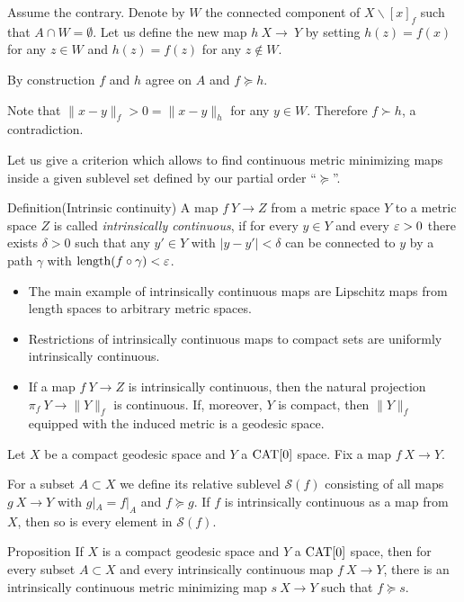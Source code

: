 \documentclass{article}
\begin{document}
Assume the contrary.
Denote by $W$ the connected component of $X\backslash [x]_f$ such that $A\cap W=\emptyset$.
Let us define the new map $h\:X\to\ Y$ by setting $h(z)=f(x)$ for any $z\in W$ and $h(z)=f(z)$ for any $z\notin W$.

By construction $f$ and $h$ agree on $A$ and $f\succcurlyeq h$.

Note that $\|x-y\|_f>0=\|x-y\|_h$ for any $y\in W$.
Therefore $f\succ h$, a contradiction.
\qeds

Let us give a criterion which allows to 
find continuous metric minimizing maps inside a given sublevel set defined by our partial order ``$\succcurlyeq$''.

\begin{thm}{Definition}(Intrinsic continuity)
A map $f\:Y\to Z$ from a metric space $Y$ to a metric space
 $Z$ is called
{\em intrinsically continuous}, if for every $y\in Y$ 
and every $\varepsilon>0$ there
exists $\delta>0$ such that any  $y'\in Y$
with $|y-y'|<\delta$ can be connected to $y$ by a path $\gamma$ 
with $\mathop{\rm length}\nolimits(f\circ\gamma)<\varepsilon$.
\end{thm}

\begin{itemize}
 \item The main example of intrinsically continuous maps are Lipschitz
maps from length spaces to arbitrary metric spaces.
\item Restrictions of intrinsically continuous maps to compact sets are uniformly intrinsically continuous. %
\item If a map $f\:Y\to Z$ is intrinsically continuous, then 
the natural projection $\pi_f\:Y\rightarrow \|Y\|_f$ is continuous. 
If, moreover, $Y$ is compact, then $\|Y\|_f$ equipped with the induced 
metric is a geodesic space.
\end{itemize}


Let $X$ be a compact geodesic space and $Y$ a $\mathop{\rm CAT}\nolimits[0]$ space. 
Fix a map $f\:X\to Y$.

For a subset $A\subset X$  we 
define its relative sublevel $\mathcal{S}(f)$ consisting of all maps $g\:X\to Y$
with $g|_{A}=f|_{A}$ and $f\succcurlyeq g$. 
If $f$ is intrinsically continuous as a map from $X$, then
so is every element in $\mathcal{S}(f)$. 

\begin{thm}{Proposition}\label{prop:exist}
If $X$ is a compact geodesic space and $Y$ a $\mathop{\rm CAT}\nolimits[0]$ space, then for every subset $A\subset X$ and every intrinsically continuous map $f\:X\rightarrow Y$,
there is an intrinsically continuous  metric minimizing map $s\:X\rightarrow Y$
such that $f\succcurlyeq s$.
\end{thm}
\end{document}
